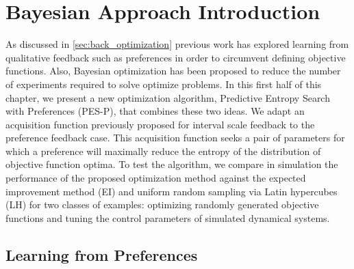 \section{Bayesian Approach Introduction} 

As discussed in \cref{sec:back_optimization} previous work has explored learning
from qualitative feedback such as preferences in order to circumvent defining
objective functions. Also, Bayesian optimization has been proposed to reduce the
number of experiments required to solve optimize problems. In this first half of
this chapter, we present a new optimization algorithm, Predictive Entropy Search
with Preferences (PES-P), that combines these two ideas. We adapt an acquisition
function previously proposed for interval scale feedback to the preference
feedback case. This acquisition function seeks a pair of parameters for which a
preference will maximally reduce the entropy of the distribution of objective
function optima. To test the algorithm, we compare in simulation the
performance of the proposed optimization method against the expected improvement
method (EI) and uniform random sampling via Latin hypercubes (LH) for two
classes of examples: optimizing randomly generated objective functions and
tuning the control parameters of simulated dynamical systems. 

\subsection{Learning from Preferences}

